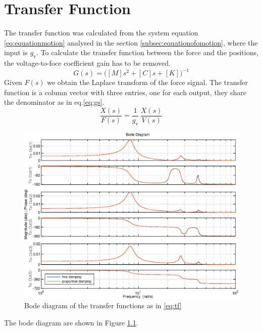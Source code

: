 \chapter{Transfer Function}\label{chap:tf}
The transfer function was calculated from the system equation
\eqref{eq:equationmotion} analysed in the section
\ref{subsec:equationofomotion}, where the input is \(g_{\text{v}}\).
To calculate the transfer function between the force and the positions, the 
voltage-to-foce coefficient gain has to be removed.
\begin{equation}\label{eq:gs}
	G(s) = \big([M]s^2+[C]s+[K]\big)^{-1}
\end{equation}
Given \(F(s)\) we obtain the Laplace transform of the force signal.
The transfer function is a column vector with three entries, one for each output,
they share the denominator as in eq.\eqref{eq:gs}.
\begin{equation}\label{eq:tf}
	\frac{X(s)}{F(s)} = \frac{1}{g_{\text{v}}}\,\frac{X(s)}{V(s)}
\end{equation}
%
\begin{figure}[htb]
	\centering
	\includegraphics[width=\linewidth]{bodediagram1}
	\caption{Bode diagram of the transfer functions as in \eqref{eq:tf}}
	\label{fig:bodeplot1}
\end{figure}
The bode diagram are shown in Figure \ref{fig:bodeplot1}.